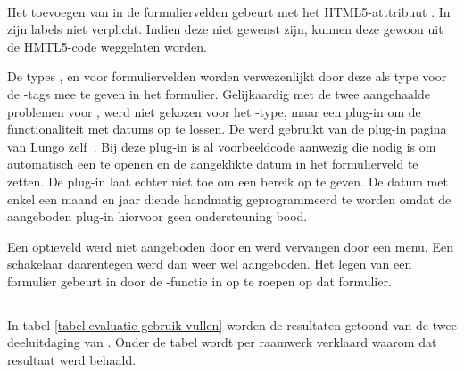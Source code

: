 \paragraph{\lungo} 
Het toevoegen van  in de formuliervelden gebeurt met het HTML5-atttribuut .
In \lungo{} zijn labels niet verplicht.
Indien deze niet gewenst zijn, kunnen deze gewoon uit de HMTL5-code weggelaten worden.

De types ,  en  voor formuliervelden worden verwezenlijkt door deze als type voor de -tags mee te geven in het formulier.
Gelijkaardig met de twee aangehaalde problemen voor \jqm{}, werd niet gekozen voor het -type, maar een plug-in om de functionaliteit met datums op te lossen.
De  werd gebruikt van de plug-in pagina van Lungo zelf~\cite{TapQuo2013b}.
Bij deze plug-in is al voorbeeldcode aanwezig die nodig is om automatisch een  te openen en de aangeklikte datum in het formulierveld te zetten.
De plug-in laat echter niet toe om een bereik op te geven.
De datum met enkel een maand en jaar diende handmatig geprogrammeerd te worden omdat de aangeboden plug-in hiervoor geen ondersteuning bood.

Een optieveld werd niet aangeboden door \lungo{} en werd vervangen door een menu. 
Een schakelaar daarentegen werd dan weer wel aangeboden.
Het legen van een formulier gebeurt in \lungo{} door de -functie in \js{} op te roepen op dat formulier.


\subsection{}
\label{sec:evaluatie-gebruik-vullen}

In tabel \ref{tabel:evaluatie-gebruik-vullen} worden de resultaten getoond van de twee deeluitdaging van .
Onder de tabel wordt per raamwerk verklaard waarom dat resultaat werd behaald.

